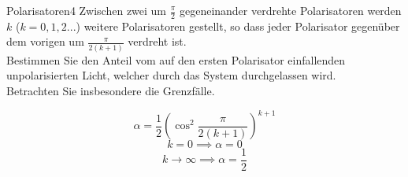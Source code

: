\begin{problem}{Polarisatoren}{4}
Zwischen zwei um $\frac{\pi}{2}$ gegeneinander verdrehte Polarisatoren werden $k$ ($k=0,1,2...$)
weitere Polarisatoren gestellt, so dass jeder Polarisator gegenüber dem vorigen um
$\frac{\pi}{2(k+1)}$ verdreht ist.\\
Bestimmen Sie den Anteil vom auf den ersten Polarisator einfallenden unpolarisierten Licht,
welcher durch das System durchgelassen wird.\\
Betrachten Sie insbesondere die Grenzfälle.
\begin{solution}
\[
\alpha=\frac{1}{2}\left( \cos^2\frac{\pi}{2(k+1)} \right)^{k+1}
\]
\[
k=0 \implies \alpha=0
\]
\[
k\to\infty \implies \alpha=\frac{1}{2}
\]
\end{solution}
\end{problem}


